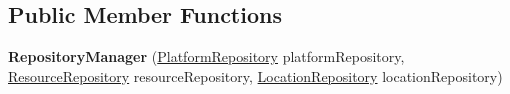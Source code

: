 \subsection*{Public Member Functions}
\begin{DoxyCompactItemize}
\item 
{\bfseries Repository\+Manager} (\hyperlink{interfaceeu_1_1h2020_1_1symbiote_1_1repository_1_1PlatformRepository}{Platform\+Repository} platform\+Repository, \hyperlink{interfaceeu_1_1h2020_1_1symbiote_1_1repository_1_1ResourceRepository}{Resource\+Repository} resource\+Repository, \hyperlink{interfaceeu_1_1h2020_1_1symbiote_1_1repository_1_1LocationRepository}{Location\+Repository} location\+Repository)\hypertarget{classeu_1_1h2020_1_1symbiote_1_1repository_1_1RepositoryManager_a7402e1dfdea6c3e6a0d8b84d4e56b7a6}{}\label{classeu_1_1h2020_1_1symbiote_1_1repository_1_1RepositoryManager_a7402e1dfdea6c3e6a0d8b84d4e56b7a6}


\end{DoxyCompactItemize}
